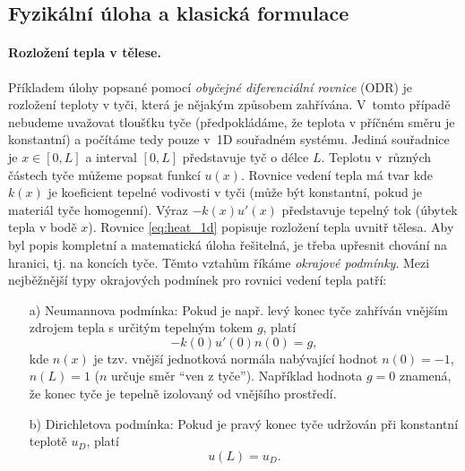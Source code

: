 \subsection{Fyzikální úloha a klasická formulace}

\paragraph{Rozložení tepla v tělese.}
Příkladem úlohy popsané pomocí \emph{obyčejné diferenciální rovnice} (ODR) je rozložení teploty v tyči,
která je nějakým způsobem zahřívána. V~tomto případě nebudeme uvažovat tloušťku
tyče (předpokládáme, že teplota v příčném směru je konstantní) a počítáme tedy pouze v~1D souřadném systému. Jediná souřadnice je
$x\in[0,L]$ a interval $[0,L]$ představuje tyč o délce $L$. Teplotu v~různých částech tyče můžeme popsat funkcí
$u(x)$. Rovnice vedení tepla má tvar
kde $k(x)$ je koeficient tepelné vodivosti v tyči (může být konstantní, pokud je materiál tyče homogenní). Výraz $-k(x)u'(x)$ představuje tepelný tok (úbytek tepla v bodě $x$).
% 
Rovnice \eqref{eq:heat_1d} popisuje rozložení tepla uvnitř tělesa.
Aby byl popis kompletní a matematická úloha řešitelná, je třeba upřesnit chování na hranici, tj. na koncích tyče.
Těmto vztahům říkáme \emph{okrajové podmínky}. Mezi nejběžnější typy okrajových podmínek pro rovnici vedení tepla patří:
\begin{enumerate}
\item[a)] Neumannova podmínka: Pokud je např. levý konec tyče zahříván vnějším zdrojem tepla s určitým tepelným tokem $g$, platí
\[ -k(0)u'(0)n(0) = g, \]
kde $n(x)$ je tzv. vnější jednotková normála nabývající hodnot $n(0)=-1$, $n(L)=1$ ($n$ určuje směr ``ven z tyče'').
Například hodnota $g=0$ znamená, že konec tyče je tepelně izolovaný od vnějšího prostředí.

\item[b)] Dirichletova podmínka: Pokud je pravý konec tyče udržován při konstantní teplotě $u_D$, platí
\[ u(L) = u_D. \]
\end{enumerate}


